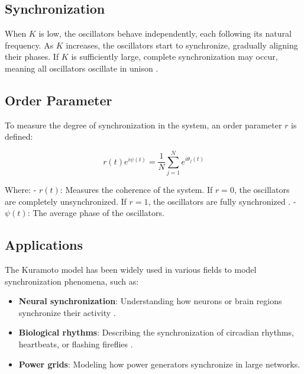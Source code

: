 \documentclass{article}
\begin{document}
\subsection*{Synchronization}
When $K$ is low, the oscillators behave independently, each following its natural frequency. As $K$ increases, the oscillators start to synchronize, gradually aligning their phases. If $K$ is sufficiently large, complete synchronization may occur, meaning all oscillators oscillate in unison \cite{kennel2010binaural}.

\subsection*{Order Parameter}

To measure the degree of synchronization in the system, an order parameter $r$ is defined:

\[
r(t) e^{i\psi(t)} = \frac{1}{N} \sum_{j=1}^{N} e^{i\theta_j(t)}
\]

Where:
- $r(t)$: Measures the coherence of the system. If $r = 0$, the oscillators are completely unsynchronized. If $r = 1$, the oscillators are fully synchronized \cite{gao2014analysis}.
- $\psi(t)$: The average phase of the oscillators.

\subsection*{Applications}

The Kuramoto model has been widely used in various fields to model synchronization phenomena, such as:
\begin{itemize}
    \item \textbf{Neural synchronization}: Understanding how neurons or brain regions synchronize their activity \cite{chaieb2015auditory}.
    \item \textbf{Biological rhythms}: Describing the synchronization of circadian rhythms, heartbeats, or flashing fireflies \cite{draganova2008cortical, jirakittayakorn2017brain}.
    \item \textbf{Power grids}: Modeling how power generators synchronize in large networks.
\end{itemize}

\end{document}
